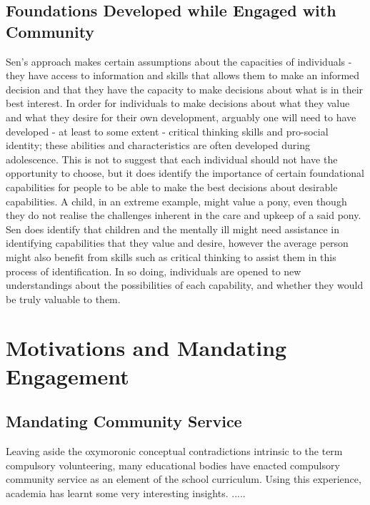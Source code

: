 \subsection{Foundations Developed while Engaged with Community} 

Sen's approach makes certain assumptions about the capacities of individuals - they have access to information and skills that allows them to make an informed decision and that they have the capacity to make decisions about what is in their best interest. In order for individuals to make decisions about what they value and what they desire for their own development, arguably one will need to have developed - at least to some extent - critical thinking skills and pro-social identity; these abilities and characteristics are often developed during adolescence. This is not to suggest that each individual should not have the opportunity to choose, but it does identify the importance of certain foundational capabilities for people to be able to make the best decisions about desirable capabilities. A child, in an extreme example, might value a pony, even though they do not realise the challenges inherent in the care and upkeep of a said pony. Sen does identify that children and the mentally ill might need assistance in identifying capabilities that they value and desire, however the average person might also benefit from skills such as critical thinking to assist them in this process of identification. In so doing, individuals are opened to new understandings about the possibilities of each capability, and whether they would be truly valuable to them. 



\section{Motivations and Mandating Engagement}


\subsection{Mandating Community Service} %
\label{Mandatory}

Leaving aside the oxymoronic conceptual contradictions intrinsic to the term compulsory volunteering, many educational bodies have enacted compulsory community service as an element of the school curriculum. Using this experience, academia has learnt some very interesting insights. .....



